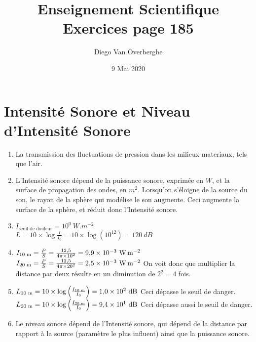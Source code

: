 \documentclass[12pt, a4paper]{article}
\newcommand{\logb}[1]{
    \log\left(#1\right)
}
\begin{document}
    \title{Enseignement Scientifique \\ Exercices page 185}
    \author{Diego Van Overberghe}
    \date{9 Mai 2020}
    \maketitle
    
    \section{Intensité Sonore et Niveau d'Intensité Sonore}
    \begin{enumerate}[1.]
        \item   La transmission des fluctuations de pression dans les milieux materiaux, tels que l'air.
        \item   L'Intensité sonore dépend de la puissance sonore, exprimée en $W$, et la surface de propagation des ondes, en $m^2$. Lorsqu'on s'éloigne de la source du son, le rayon de la sphère qui modélise le son augmente. Ceci augmente la surface de la sphère, et réduit donc l'Intensité sonore.
        \item   $I_\text{seuil de douleur}=10^0\ \si{W.m^{-2}}$ \\ $L=10\times\log{\frac{I}{I_0}}=10\times\logb{10^{12}}=120\ \si{dB}$
        \item   $I_\text{10\ \si{m}}=\frac{P}{S}=\frac{12{,}5}{4\pi\times 10^2}=9{,}9\times 10^{-3}\ \si{W.m^{-2}}$ \smallbreak $I_\text{20\ \si{m}}=\frac{P}{S}=\frac{12{,}5}{4\pi\times 20^2}=2{,}5\times 10^{-3}\ \si{W.m^{-2}}$ \smallbreak On voit donc que multiplier la distance par deux résulte en un diminution de $2^2=4$ fois.
        \item $L_\text{10\ \si{m}}=10\times\logb{\frac{I_\text{10\ \si{m}}}{I_0}}=1{,}0\times 10^2\ \si{dB}$ \quad Ceci dépasse le seuil de danger. \smallbreak $L_\text{20\ \si{m}}=10\times\logb{\frac{I_\text{20\ \si{m}}}{I_0}}=9{,}4\times 10^{1}\ \si{dB}$ \quad Ceci dépasse aussi le seuil de danger.
        \item Le niveau sonore dépend de l'Intensité sonore, qui dépend de la distance par rapport à la source (paramètre le plus influent) ainsi que la puissance sonore.
    \end{enumerate}
\end{document}
